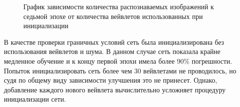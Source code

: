 \documentclass[utf8,usehyperref,14pt]{G7-32}
\begin{document}
\begin{figure}[H]
  \caption{График зависимости количества распознаваемых изображений к седьмой эпохе от количества вейвлетов использованных при инициализации}\label{conwave_different_count_oneline}
\end{figure}
В качестве проверки граничных условий сеть была инициализирована без использования вейвлетов и шума. В данном случае сеть показала крайне медленное обучение и к концу первой эпохи имела более 90\% погрешности. Попыток инициализировать сеть более чем 30 вейвлетами не проводилось, но судя по общему виду зависимости улучшения это не принесет. Однако, добавление каждого нового вейвлета вычислительно усложняет процедуру инициализации сети.
\end{document}
